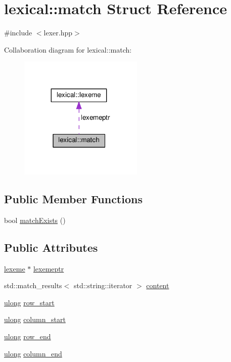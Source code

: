 \hypertarget{structlexical_1_1match}{}\section{lexical\+:\+:match Struct Reference}
\label{structlexical_1_1match}


{\ttfamily \#include $<$lexer.\+hpp$>$}



Collaboration diagram for lexical\+:\+:match\+:\nopagebreak
\begin{figure}[H]
\begin{center}
\leavevmode
\includegraphics[width=167pt]{structlexical_1_1match__coll__graph}
\end{center}
\end{figure}
\subsection*{Public Member Functions}
\begin{DoxyCompactItemize}
\item 
bool \hyperlink{structlexical_1_1match_aafa3ddcad89ea3abb86b557cafe3e0d7}{match\+Exists} ()
\end{DoxyCompactItemize}
\subsection*{Public Attributes}
\begin{DoxyCompactItemize}
\item 
\hyperlink{classlexical_1_1lexeme}{lexeme} $\ast$ \hyperlink{structlexical_1_1match_a346ef13017b47ee41a6abe643e5732e1}{lexemeptr}
\item 
std\+::match\+\_\+results$<$ std\+::string\+::iterator $>$ \hyperlink{structlexical_1_1match_a2ebda7888d347b3de302ffc465755f07}{content}
\item 
\hyperlink{types_8h_ab2bb0e5480d1d957383df6b350794313}{ulong} \hyperlink{structlexical_1_1match_a854a8828680bbfc08aa214e875ba5514}{row\+\_\+start}
\item 
\hyperlink{types_8h_ab2bb0e5480d1d957383df6b350794313}{ulong} \hyperlink{structlexical_1_1match_a3a1754ba678051a508ee2889c4a5f4eb}{column\+\_\+start}
\item 
\hyperlink{types_8h_ab2bb0e5480d1d957383df6b350794313}{ulong} \hyperlink{structlexical_1_1match_abf7eca2de9cee016df02265a38666486}{row\+\_\+end}
\item 
\hyperlink{types_8h_ab2bb0e5480d1d957383df6b350794313}{ulong} \hyperlink{structlexical_1_1match_ac9b0f6134b653452a2b0ff8b36c89729}{column\+\_\+end}
\end{DoxyCompactItemize}


